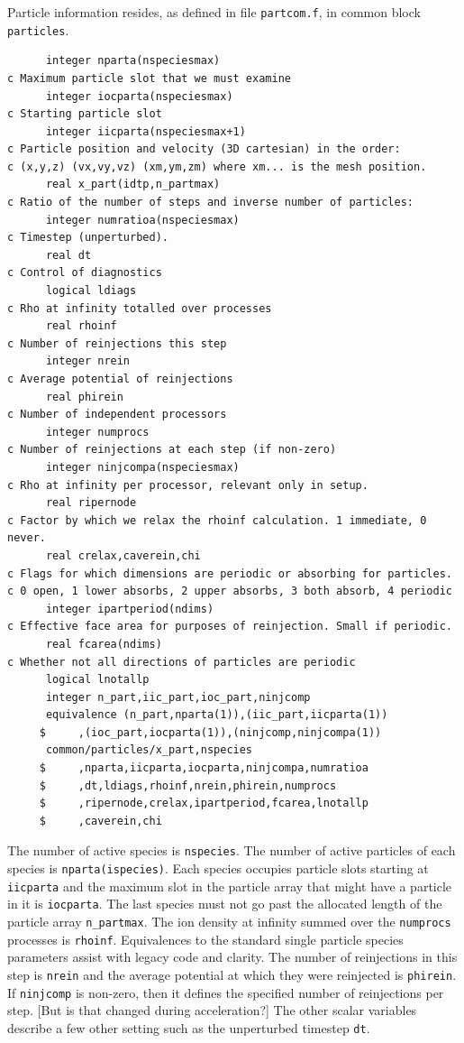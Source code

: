\documentclass[12pt]{article}
\begin{document}
Particle information resides, as defined in file \verb!partcom.f!, in
common block \verb!particles!.
\begin{verbatim}
      integer nparta(nspeciesmax)
c Maximum particle slot that we must examine
      integer iocparta(nspeciesmax)
c Starting particle slot
      integer iicparta(nspeciesmax+1)
c Particle position and velocity (3D cartesian) in the order:
c (x,y,z) (vx,vy,vz) (xm,ym,zm) where xm... is the mesh position.
      real x_part(idtp,n_partmax)
c Ratio of the number of steps and inverse number of particles:
      integer numratioa(nspeciesmax)
c Timestep (unperturbed).
      real dt
c Control of diagnostics
      logical ldiags
c Rho at infinity totalled over processes
      real rhoinf
c Number of reinjections this step
      integer nrein
c Average potential of reinjections
      real phirein
c Number of independent processors
      integer numprocs
c Number of reinjections at each step (if non-zero)
      integer ninjcompa(nspeciesmax)
c Rho at infinity per processor, relevant only in setup.
      real ripernode
c Factor by which we relax the rhoinf calculation. 1 immediate, 0 never.
      real crelax,caverein,chi
c Flags for which dimensions are periodic or absorbing for particles.
c 0 open, 1 lower absorbs, 2 upper absorbs, 3 both absorb, 4 periodic
      integer ipartperiod(ndims)
c Effective face area for purposes of reinjection. Small if periodic.
      real fcarea(ndims)
c Whether not all directions of particles are periodic
      logical lnotallp
      integer n_part,iic_part,ioc_part,ninjcomp
      equivalence (n_part,nparta(1)),(iic_part,iicparta(1))
     $     ,(ioc_part,iocparta(1)),(ninjcomp,ninjcompa(1))
      common/particles/x_part,nspecies
     $     ,nparta,iicparta,iocparta,ninjcompa,numratioa
     $     ,dt,ldiags,rhoinf,nrein,phirein,numprocs
     $     ,ripernode,crelax,ipartperiod,fcarea,lnotallp
     $     ,caverein,chi
\end{verbatim}
The number of active species is \verb!nspecies!.
The number of active particles of each species is
\verb!nparta(ispecies)!. Each species occupies particle slots starting
at \verb!iicparta! and the maximum slot in the particle array that
might have a particle in it is \verb!iocparta!. The last species must
not go past the allocated length of the particle array
\verb!n_partmax!. The ion density at infinity summed over the
\verb!numprocs! processes is \verb!rhoinf!. Equivalences to the
standard single particle species parameters assist with legacy code
and clarity. The number of reinjections
in this step is \verb!nrein!  and the average potential at which they
were reinjected is \verb!phirein!. If \verb!ninjcomp! is non-zero,
then it defines the specified number of reinjections per step. [But is
that changed during acceleration?]  The other scalar variables
describe a few other setting such as the unperturbed timestep
\verb!dt!.
\end{document}
